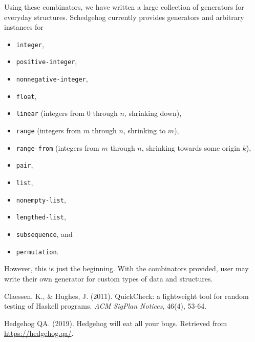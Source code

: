\documentclass{scrartcl}
\begin{document}
Using these combinators, we have written a large collection of
generators for everyday structures.
Schedgehog currently provides generators and arbitrary instances for
\begin{itemize}
  \item \verb|integer|,
  \item \verb|positive-integer|,
  \item \verb|nonnegative-integer|,
  \item \verb|float|,
  \item \verb|linear| (integers from \(0\) through \(n\), shrinking down),
  \item \verb|range| (integers from \(m\) through \(n\), shrinking to \(m\)),
  \item \verb|range-from| (integers from \(m\) through \(n\),
                           shrinking towards some origin \(k\)),
  \item \verb|pair|,
  \item \verb|list|,
  \item \verb|nonempty-list|,
  \item \verb|lengthed-list|,
  \item \verb|subsequence|, and
  \item \verb|permutation|.
\end{itemize}
However, this is just the beginning.
With the combinators provided, user may write their own
generator for custom types of data and structures.




\begin{thebibliography}{99}

Claessen, K., \& Hughes, J. (2011). QuickCheck: a lightweight tool for random
testing of Haskell programs. \textit{ACM SigPlan Notices}, 46(4), 53-64.

Hedgehog QA. (2019). Hedgehog will eat all your bugs. Retrieved from
\url{https://hedgehog.qa/}.

\end{thebibliography}
\end{document}
